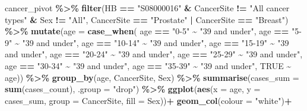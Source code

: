 \documentclass[
]{article}
\newenvironment{Shaded}{\begin{snugshade}}{\end{snugshade}}
\newcommand{\AttributeTok}[1]{\textcolor[rgb]{0.13,0.29,0.53}{#1}}
\newcommand{\ConstantTok}[1]{\textcolor[rgb]{0.56,0.35,0.01}{#1}}
\newcommand{\FunctionTok}[1]{\textcolor[rgb]{0.13,0.29,0.53}{\textbf{#1}}}
\newcommand{\NormalTok}[1]{#1}
\newcommand{\SpecialCharTok}[1]{\textcolor[rgb]{0.81,0.36,0.00}{\textbf{#1}}}
\newcommand{\StringTok}[1]{\textcolor[rgb]{0.31,0.60,0.02}{#1}}
\begin{document}
\begin{Shaded}
\begin{Highlighting}[]
\NormalTok{cancer\_pivot }\SpecialCharTok{\%\textgreater{}\%}  \FunctionTok{filter}\NormalTok{(HB }\SpecialCharTok{==} \StringTok{"S08000016"} \SpecialCharTok{\&} 
\NormalTok{                           CancerSite }\SpecialCharTok{!=} \StringTok{"All cancer types"} \SpecialCharTok{\&} 
\NormalTok{                           Sex }\SpecialCharTok{!=} \StringTok{"All"}\NormalTok{,}
\NormalTok{                           CancerSite }\SpecialCharTok{==} \StringTok{"Prostate"} \SpecialCharTok{|} 
\NormalTok{                           CancerSite }\SpecialCharTok{==} \StringTok{"Breast"}\NormalTok{) }\SpecialCharTok{\%\textgreater{}\%} 
  \FunctionTok{mutate}\NormalTok{(}\AttributeTok{age =} \FunctionTok{case\_when}\NormalTok{(}
\NormalTok{   age }\SpecialCharTok{==} \StringTok{"0{-}5"} \SpecialCharTok{\textasciitilde{}} \StringTok{"39 and under"}\NormalTok{,}
\NormalTok{   age }\SpecialCharTok{==} \StringTok{"5{-}9"} \SpecialCharTok{\textasciitilde{}} \StringTok{"39 and under"}\NormalTok{,}
\NormalTok{   age }\SpecialCharTok{==} \StringTok{"10{-}14"} \SpecialCharTok{\textasciitilde{}} \StringTok{"39 and under"}\NormalTok{,}
\NormalTok{   age }\SpecialCharTok{==} \StringTok{"15{-}19"} \SpecialCharTok{\textasciitilde{}} \StringTok{"39 and under"}\NormalTok{,}
\NormalTok{   age }\SpecialCharTok{==} \StringTok{"20{-}24"} \SpecialCharTok{\textasciitilde{}} \StringTok{"39 and under"}\NormalTok{,}
\NormalTok{   age }\SpecialCharTok{==} \StringTok{"25{-}29"} \SpecialCharTok{\textasciitilde{}} \StringTok{"39 and under"}\NormalTok{,}
\NormalTok{   age }\SpecialCharTok{==} \StringTok{"30{-}34"} \SpecialCharTok{\textasciitilde{}} \StringTok{"39 and under"}\NormalTok{,}
\NormalTok{   age }\SpecialCharTok{==} \StringTok{"35{-}39"} \SpecialCharTok{\textasciitilde{}} \StringTok{"39 and under"}\NormalTok{,}
   \ConstantTok{TRUE} \SpecialCharTok{\textasciitilde{}}\NormalTok{ age)) }\SpecialCharTok{\%\textgreater{}\%} 
  \FunctionTok{group\_by}\NormalTok{(age, CancerSite, Sex) }\SpecialCharTok{\%\textgreater{}\%} 
  \FunctionTok{summarise}\NormalTok{(}\AttributeTok{cases\_sum =} \FunctionTok{sum}\NormalTok{(cases\_count), }\AttributeTok{.group =} \StringTok{"drop"}\NormalTok{) }\SpecialCharTok{\%\textgreater{}\%}
  \FunctionTok{ggplot}\NormalTok{(}\FunctionTok{aes}\NormalTok{(}\AttributeTok{x =}\NormalTok{ age, }\AttributeTok{y =}\NormalTok{ cases\_sum, }\AttributeTok{group =}\NormalTok{ CancerSite, }\AttributeTok{fill =}\NormalTok{ Sex))}\SpecialCharTok{+}
  \FunctionTok{geom\_col}\NormalTok{(}\AttributeTok{colour =} \StringTok{"white"}\NormalTok{)}\SpecialCharTok{+}

\end{Highlighting}
\end{Shaded}
\end{document}

